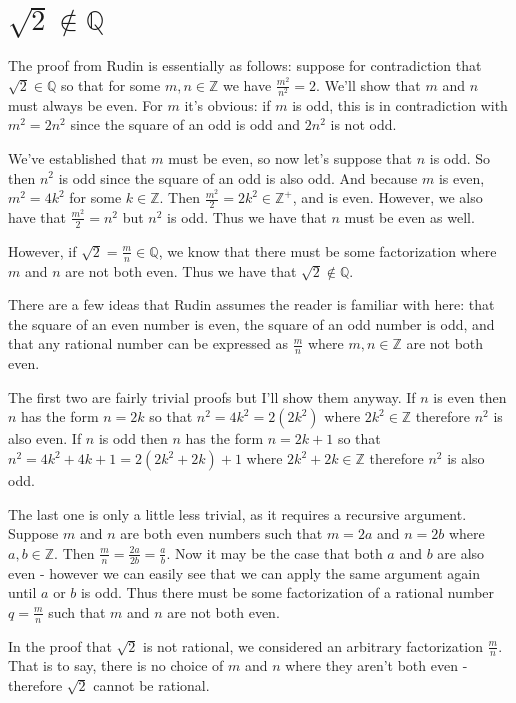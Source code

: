 \documentclass{article}
\newcommand{\Q}{\mathbb{Q}}
\newcommand{\Z}{\mathbb{Z}}
\let\endoldproof\endproof
\renewenvironment{proof}[1][\proofname]
  {\begin{adjustwidth}{2em}{2em}
   \oldproof[#1]}
  {\endoldproof
   \end{adjustwidth}}
\begin{document}
\section{$\sqrt{2} \not\in \Q$}
\begin{proof}
The proof from Rudin is essentially as follows: suppose for contradiction that
$\sqrt{2} \in \Q$ so that for some $m, n \in \Z$ we have $\frac{m^2}{n^2} = 2$.
We'll show that $m$ and $n$ must always be even. For $m$ it's obvious: if $m$
is odd, this is in contradiction with $m^2 = 2n^2$ since the square of an odd
is odd and $2n^2$ is not odd.

We've established that $m$ must be even, so now let's suppose that $n$ is odd.
So then $n^2$ is odd since the square of an odd is also odd.
And because $m$ is even, $m^2 = 4k^2$ for some $k\in\Z$. Then $\frac{m^2}{2} =
2k^2 \in \Z^+$, and is even. However, we also have that $\frac{m^2}{2} = n^2$
but $n^2$ is odd. Thus we have that $n$ must be even as well.

However, if $\sqrt{2} = \frac{m}{n} \in \Q$, we know that there must be some
factorization where $m$ and $n$ are not both even. Thus we have that $\sqrt{2}
\not\in \Q$.
\end{proof}

There are a few ideas that Rudin assumes the reader is familiar with here: that
the square of an even number is even, the square of an odd number is odd, and
that any rational number can be expressed as $\frac{m}{n}$ where $m, n \in \Z$
are not both even.

The first two are fairly trivial proofs but I'll show them anyway. If $n$ is
even then $n$ has the form $n = 2k$ so that $n^2 = 4k^2 = 2(2k^2)$ where $2k^2
\in \Z$ therefore $n^2$ is also even. If $n$ is odd then $n$ has the form $n =
2k+1$ so that $n^2 = 4k^2 + 4k + 1 = 2(2k^2+2k) + 1$ where $2k^2+2k \in \Z$
therefore $n^2$ is also odd.

The last one is only a little less trivial, as it requires a recursive argument.
Suppose $m$ and $n$ are both even numbers such that $m = 2a$ and $n = 2b$ where
$a, b \in \Z$. Then $\frac{m}{n} = \frac{2a}{2b} = \frac{a}{b}$. Now it may be
the case that both $a$ and $b$ are also even - however we can easily see that
we can apply the same argument again until $a$ or $b$ is odd. Thus there must
be some factorization of a rational number $q = \frac{m}{n}$ such that $m$ and
$n$ are not both even.

In the proof that $\sqrt{2}$ is not rational, we considered an arbitrary
factorization $\frac{m}{n}$. That is to say, there is no choice of $m$ and $n$
where they aren't both even - therefore $\sqrt{2}$ cannot be rational.
\end{document}
